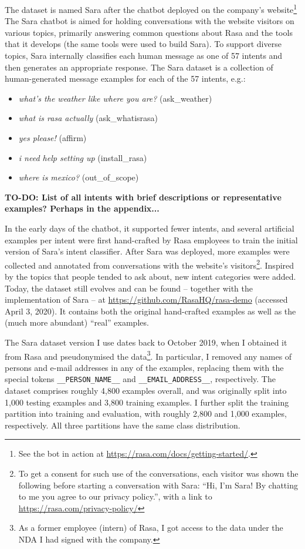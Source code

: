 \documentclass[bsc,frontabs,twoside,singlespacing,parskip,deptreport]{infthesis}
\begin{document}
{{{      The dataset is named Sara after the chatbot deployed on the company's website\footnote{See the bot in action at \url{https://rasa.com/docs/getting-started/}.}
      The Sara chatbot is aimed for holding conversations with the website visitors on various topics, primarily answering common questions about Rasa and the tools that it develops (the same tools were used to build Sara).
      To support diverse topics, Sara internally classifies each human message as one of 57 intents and then generates an appropriate response. The Sara dataset is a collection of human-generated message examples for each of the 57 intents, e.g.:
      \begin{itemize}
        \item \textit{what's the weather like where you are?} (ask\_weather)
        \item \textit{what is rasa actually} (ask\_whatisrasa)
        \item \textit{yes please!} (affirm)
        \item \textit{i need help setting up} (install\_rasa)
        \item \textit{where is mexico?} (out\_of\_scope)
      \end{itemize}
      \textbf{TO-DO: List of all intents with brief descriptions or representative examples? Perhaps in the appendix...}

      In the early days of the chatbot, it supported fewer intents, and several artificial examples per intent were first hand-crafted by Rasa employees to train the initial version of Sara's intent classifier. After Sara was deployed, more examples were collected and annotated from conversations with the website's visitors\footnote{To get a consent for such use of the conversations, each visitor was shown the following before starting a conversation with Sara: ``Hi, I'm Sara! By chatting to me you agree to our privacy policy.'', with a link to \url{https://rasa.com/privacy-policy/}}. Inspired by the topics that people tended to ask about, new intent categories were added. Today, the dataset still evolves and can be found -- together with the implementation of Sara -- at \url{https://github.com/RasaHQ/rasa-demo} (accessed April 3, 2020). It contains both the original hand-crafted examples as well as the (much more abundant) ``real'' examples.

      The Sara dataset version I use dates back to October 2019, when I obtained it from Rasa and pseudonymised the data\footnote{As a former employee (intern) of Rasa, I got access to the data under the NDA I had signed with the company.}. In particular, I removed any names of persons and e-mail addresses in any of the examples, replacing them with the special tokens \verb|__PERSON_NAME__| and \verb|__EMAIL_ADDRESS__|, respectively.      
      The dataset comprises roughly 4,800 examples overall, and was originally split into 1,000 testing examples and 3,800 training examples. 
      I further split the training partition into training and evaluation, with roughly 2,800 and 1,000 examples, respectively. All three partitions have the same class distribution.

}}}
\end{document}
